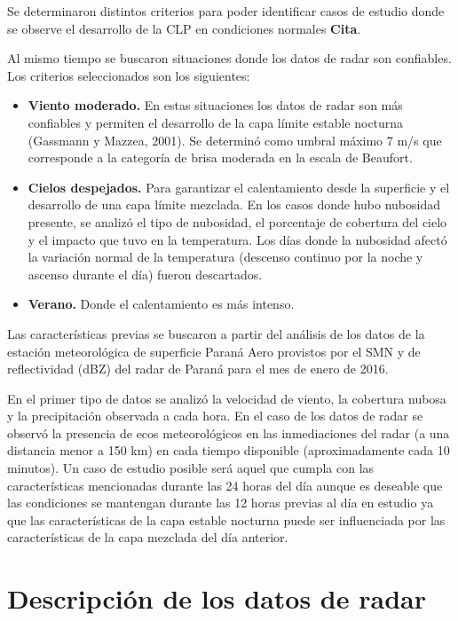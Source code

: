 \documentclass[12pt,spanish,oneside, a4paper]{book}
\providecommand{\tightlist}{%
  \setlength{\itemsep}{0pt}\setlength{\parskip}{0pt}}
\begin{document}
Se determinaron distintos criterios para poder identificar casos de
estudio donde se observe el desarrollo de la CLP en condiciones normales
\textbf{Cita}.

Al mismo tiempo se buscaron situaciones donde los datos de radar son
confiables. Los criterios seleccionados son los siguientes:

\begin{itemize}
\tightlist
\item
  \textbf{Viento moderado.} En estas situaciones los datos de radar son
  más confiables y permiten el desarrollo de la capa límite estable
  nocturna (Gassmann y Mazzea, 2001). Se determinó como umbral máximo 7
  m/s que corresponde a la categoría de brisa moderada en la escala de
  Beaufort.
\item
  \textbf{Cielos despejados.} Para garantizar el calentamiento desde la
  superficie y el desarrollo de una capa límite mezclada. En los casos
  donde hubo nubosidad presente, se analizó el tipo de nubosidad, el
  porcentaje de cobertura del cielo y el impacto que tuvo en la
  temperatura. Los días donde la nubosidad afectó la variación normal de
  la temperatura (descenso continuo por la noche y ascenso durante el
  día) fueron descartados.
\item
  \textbf{Verano.} Donde el calentamiento es más intenso.
\end{itemize}

Las características previas se buscaron a partir del análisis de los
datos de la estación meteorológica de superficie Paraná Aero provistos
por el SMN y de reflectividad (dBZ) del radar de Paraná para el mes de
enero de 2016.

En el primer tipo de datos se analizó la velocidad de viento, la
cobertura nubosa y la precipitación observada a cada hora. En el caso de
los datos de radar se observó la presencia de ecos meteorológicos en las
inmediaciones del radar (a una distancia menor a 150 km) en cada tiempo
disponible (aproximadamente cada 10 minutos). Un caso de estudio posible
será aquel que cumpla con las características mencionadas durante las 24
horas del día aunque es deseable que las condiciones se mantengan
durante las 12 horas previas al día en estudio ya que las
características de la capa estable nocturna puede ser influenciada por
las características de la capa mezclada del día anterior.

\section{Descripción de los datos de
radar}\label{descripcion-de-los-datos-de-radar}
\end{document}
